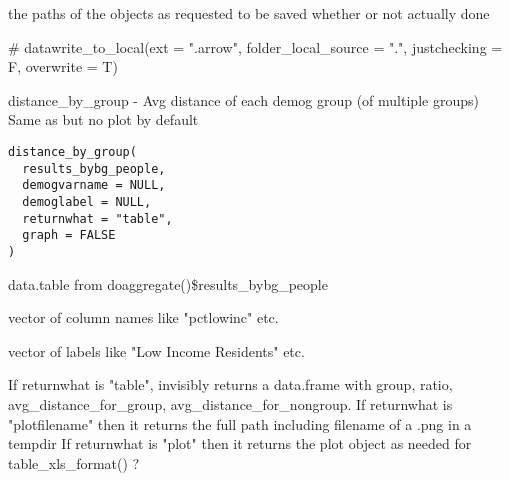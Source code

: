 \documentclass[a4paper]{book}
\begin{document}
%
\begin{Value}
the paths of the objects as requested to be saved whether or not actually done
\end{Value}
%
\begin{SeeAlso}\relax
{}    
\end{SeeAlso}
%
\begin{Examples}
\begin{ExampleCode}
  # datawrite_to_local(ext = ".arrow", folder_local_source = ".", justchecking = F, overwrite = T) 
\end{ExampleCode}
\end{Examples}
%
\begin{Description}\relax
distance\_by\_group - Avg distance of each demog group (of multiple groups)
Same as  but no plot by default
\end{Description}
%
\begin{Usage}
\begin{verbatim}
distance_by_group(
  results_bybg_people,
  demogvarname = NULL,
  demoglabel = NULL,
  returnwhat = "table",
  graph = FALSE
)
\end{verbatim}
\end{Usage}
%
\begin{Arguments}
\begin{ldescription}
\item[\code{results\_bybg\_people}] data.table from doaggregate()\$results\_bybg\_people

\item[\code{demogvarname}] vector of column names like "pctlowinc" etc.

\item[\code{demoglabel}] vector of labels like "Low Income Residents" etc.

\item[\code{returnwhat}] If returnwhat is "table", invisibly returns a
data.frame with group, ratio, avg\_distance\_for\_group, avg\_distance\_for\_nongroup.
If returnwhat is "plotfilename" then it returns the full path including filename of a .png in a tempdir
If returnwhat is "plot" then it returns the plot object as needed for table\_xls\_format() ?
\end{ldescription}
\end{Arguments}
\end{document}
